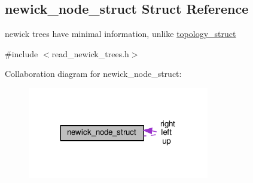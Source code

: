 \hypertarget{structnewick__node__struct}{}\subsection{newick\+\_\+node\+\_\+struct Struct Reference}
\label{structnewick__node__struct}


newick trees have minimal information, unlike \hyperlink{structtopology__struct}{topology\+\_\+struct}  




{\ttfamily \#include $<$read\+\_\+newick\+\_\+trees.\+h$>$}



Collaboration diagram for newick\+\_\+node\+\_\+struct\+:\nopagebreak
\begin{figure}[H]
\begin{center}
\leavevmode
\includegraphics[width=224pt]{structnewick__node__struct__coll__graph}
\end{center}
\end{figure}

